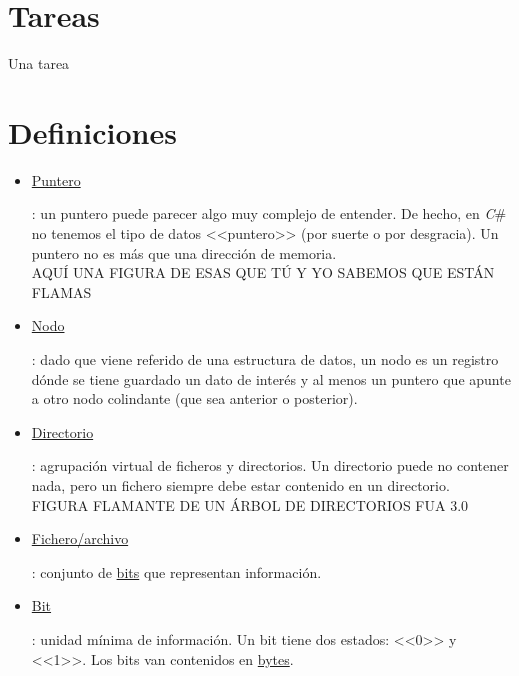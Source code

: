 \documentclass[11pt, oneside]{book}		%
\begin{document}
\chapter{Tareas}
Una tarea
\chapter*{Definiciones} %
\label{ch:definiciones}
\begin{itemize}

	\item \hypertarget{punteroDef}{\hyperlink{punteroRet}{Puntero}}: un puntero puede parecer algo muy complejo de entender. De hecho, en \textit{C}\# no tenemos el tipo de datos <<puntero>> (por suerte o por desgracia). Un puntero no es más que una dirección de memoria. 
	\\AQUÍ UNA FIGURA DE ESAS QUE TÚ Y YO SABEMOS QUE ESTÁN FLAMAS
	
	\item \hypertarget{nodoDef}{\hyperlink{nodoRet}{Nodo}}: dado que viene referido de una estructura de datos, un nodo es un registro dónde se tiene guardado un dato de interés y al menos un puntero que apunte a otro nodo colindante (que sea anterior o posterior). 
	
	\item \hypertarget{directorioDef}{\hyperlink{directorioRet}{Directorio}}: agrupación virtual de ficheros y directorios. Un directorio puede no contener nada, pero un fichero siempre debe estar contenido en un directorio.
	\\FIGURA FLAMANTE DE UN ÁRBOL DE DIRECTORIOS FUA 3.0
	
	\item \hypertarget{ficheroDef}{\hyperlink{ficheroRet}{Fichero/archivo}}: conjunto de \hypertarget{bitRet}{\hyperlink{bitDef}{bits}} que representan información.
	
	\item \hypertarget{bitDef}{\hyperlink{bitRet}{Bit}}: unidad mínima de información. Un bit tiene dos estados: <<0>> y <<1>>. Los bits van contenidos en \hypertarget{byteRet}{\hyperlink{byteDef}{bytes}}.
	

\end{itemize}
\end{document}
